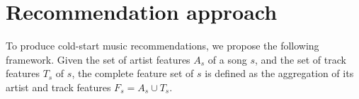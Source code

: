 

\section{Recommendation approach}
\label{sec:cold-rec:approach}



To produce cold-start music recommendations, we propose the following framework.
Given the set of artist features $A_{s}$ of a song $s$, and the set of track features $T_{s}$ of $s$, the complete feature set of $s$ is defined as the aggregation of its artist and track features $F_{s} = A_{s} \cup T_{s}$.

